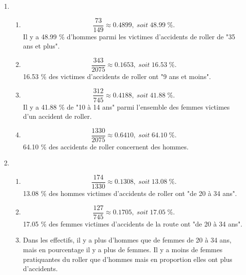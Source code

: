 \documentclass[12pt,a4paper]{article}
\begin{document}
\begin{enumerate}[label=\arabic*. ]
	\item \begin{enumerate}[label=\alph*)]
		\item \begin{equation*}
			\dfrac{73}{149} \approx \num{0.4899},\; soit\; \num{48.99}\; \%.
		\end{equation*}
		Il y a \num{48.99} \% d'hommes parmi les victimes d'accidents de roller de "35 ans et plus".
		
		\item \begin{equation*}
			\dfrac{343}{2075} \approx \num{0.1653},\; soit\; \num{16.53}\; \%.
		\end{equation*}
		\num{16.53} \% des victimes d'accidents de roller ont "9 ans et moins".
		
		\item \begin{equation*}
			\dfrac{312}{745} \approx \num{0.4188},\; soit\; \num{41.88}\; \%.
		\end{equation*}
		Il y a \num{41.88} \% de "10 à 14 ans" parmi l'ensemble des femmes victimes d'un accident de roller.
		
		\item \begin{equation*}
			\dfrac{1330}{2075} \approx \num{0.6410},\; soit\; \num{64.10}\; \%.
		\end{equation*}
		\num{64.10} \% des accidents de roller concernent des hommes.
	\end{enumerate}
	
	\medskip 
	
	\item \begin{enumerate}[label=\alph*)]
		\item \begin{equation*}
			\dfrac{174}{1330} \approx \num{0.1308},\; soit \; \num{13.08}\; \%.
		\end{equation*}
		\num{13.08} \% des hommes victimes d'accidents de roller ont "de 20 à 34 ans".
		
		\item \begin{equation*}
			\dfrac{127}{745} \approx \num{0.1705},\; soit \; \num{17.05}\; \%.
		\end{equation*}
		\num{17.05} \% des femmes victimes d'accidents de la route ont "de 20 à 34 ans".
		
		\item Dans les effectifs, il y a plus d'hommes que de femmes de 20 à 34 ans, mais en pourcentage il y a plus de femmes. Il y a moins de femmes pratiquantes du roller que d'hommes mais en proportion elles ont plus d'accidents.
	\end{enumerate}
	

\end{enumerate}
\end{document}
